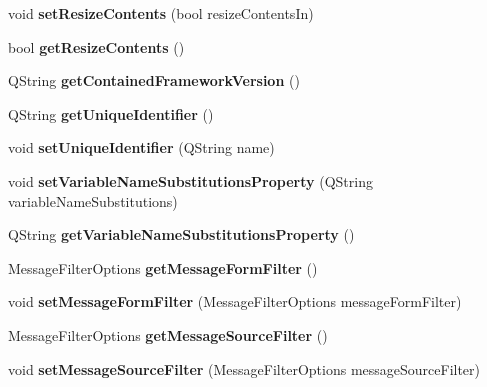 \begin{DoxyCompactItemize}
\item 
\hypertarget{classQEForm_ad701a3428cf7492199bc67adc43599c6}{
void {\bfseries setResizeContents} (bool resizeContentsIn)}
\label{classQEForm_ad701a3428cf7492199bc67adc43599c6}

\item 
\hypertarget{classQEForm_a4f07864f8376f3b5be1865aff1324a54}{
bool {\bfseries getResizeContents} ()}
\label{classQEForm_a4f07864f8376f3b5be1865aff1324a54}

\item 
\hypertarget{classQEForm_a5a0fe62cf54d7107b5575195b6f94f41}{
QString {\bfseries getContainedFrameworkVersion} ()}
\label{classQEForm_a5a0fe62cf54d7107b5575195b6f94f41}

\item 
\hypertarget{classQEForm_a144be07abd87acd1edd238befbd667b8}{
QString {\bfseries getUniqueIdentifier} ()}
\label{classQEForm_a144be07abd87acd1edd238befbd667b8}

\item 
\hypertarget{classQEForm_a84666268c3af6024eaf1d443e761b606}{
void {\bfseries setUniqueIdentifier} (QString name)}
\label{classQEForm_a84666268c3af6024eaf1d443e761b606}

\item 
\hypertarget{classQEForm_ae6c3e00324dd52803bee95f4ca335280}{
void {\bfseries setVariableNameSubstitutionsProperty} (QString variableNameSubstitutions)}
\label{classQEForm_ae6c3e00324dd52803bee95f4ca335280}

\item 
\hypertarget{classQEForm_a17e348ecd1fca01767adbfabc1c3915b}{
QString {\bfseries getVariableNameSubstitutionsProperty} ()}
\label{classQEForm_a17e348ecd1fca01767adbfabc1c3915b}

\item 
\hypertarget{classQEForm_a7381a1191c48e620e9c7e99d23380d9b}{
MessageFilterOptions {\bfseries getMessageFormFilter} ()}
\label{classQEForm_a7381a1191c48e620e9c7e99d23380d9b}

\item 
\hypertarget{classQEForm_a7dc4ee4eed388213f1f334e1bcfa9128}{
void {\bfseries setMessageFormFilter} (MessageFilterOptions messageFormFilter)}
\label{classQEForm_a7dc4ee4eed388213f1f334e1bcfa9128}

\item 
\hypertarget{classQEForm_a9cd263542053a4205356b8c150adfb3d}{
MessageFilterOptions {\bfseries getMessageSourceFilter} ()}
\label{classQEForm_a9cd263542053a4205356b8c150adfb3d}

\item 
\hypertarget{classQEForm_a760522f9b3caa4464ae5bd5943170503}{
void {\bfseries setMessageSourceFilter} (MessageFilterOptions messageSourceFilter)}
\label{classQEForm_a760522f9b3caa4464ae5bd5943170503}

\end{DoxyCompactItemize}

